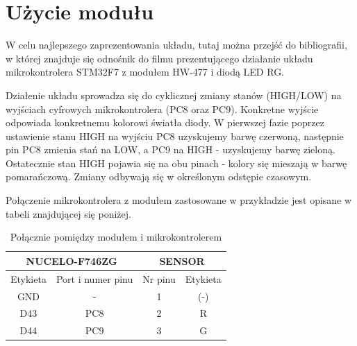 \documentclass[11pt, a4paper]{article}
\begin{document}
\newpage

\section{Użycie modułu}
W celu najlepszego zaprezentowania układu, tutaj \cite{prezentacja} można przejść do bibliografii, w której znajduje się odnośnik do filmu prezentującego działanie układu mikrokontrolera STM32F7 z modułem HW-477 i diodą LED RG.

\vspace{0.5cm}
Działenie układu sprowadza się do cyklicznej zmiany stanów (HIGH/LOW) na wyjściach cyfrowych mikrokontrolera (PC8 oraz PC9). Konkretne wyjście odpowiada konkretnemu kolorowi światła diody. W pierwszej fazie poprzez ustawienie stanu HIGH na wyjściu PC8 uzyskujemy barwę czerwoną, następnie pin PC8 zmienia stań na LOW, a PC9 na HIGH - uzyskujemy barwę zieloną. Ostatecznie stan HIGH pojawia się na obu pinach - kolory się mieszają w barwę pomarańczową. Zmiany odbywają się w określonym odstępie czasowym. 

\vspace{0.5cm}
Połączenie mikrokontrolera z modułem zastosowane w przykładzie jest opisane w tabeli znajdującej się poniżej.

\vspace{0.5cm}
\begin{table}[h!]
    \centering
    \begin{tabular}{|c|c|c|c|} 
        \hline
        \multicolumn{2}{|c|}{NUCELO-F746ZG} & \multicolumn{2}{c|}{SENSOR}  \\ 
        \hline
        Etykieta & Port i numer pinu       & Nr pinu & Etykieta           \\ 
        \hline
        GND      & -                     & 1       & (-)              
        \\
        \hline
        D43      & PC8                     & 2       & R            
        \\
        \hline
        D44      & PC9                       & 3       & G              \\
        \hline
    \end{tabular}
    \caption{Połącznie pomiędzy modułem i mikrokontrolerem}
\end{table}
\end{document}
